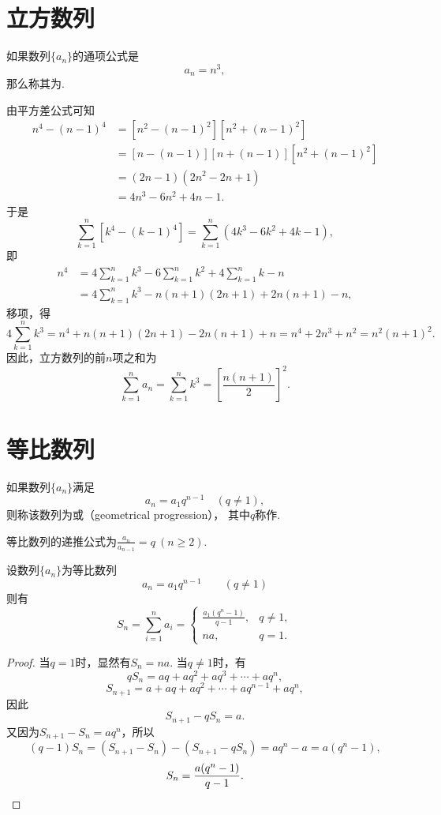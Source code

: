 \section{立方数列}
如果数列\(\{a_n\}\)的通项公式是\[
a_n = n^3,
\]那么称其为.

由平方差公式可知
\[\begin{aligned}
n^4 - (n-1)^4
&= [n^2 - (n-1)^2] [n^2 + (n-1)^2] \\
&= [n - (n-1)] [n + (n-1)] [n^2 + (n-1)^2] \\
&= (2n-1) (2n^2 - 2n + 1) \\
&= 4n^3 - 6n^2 + 4n - 1.
\end{aligned}\]
于是\[
\sum\limits_{k=1}^n [k^4 - (k-1)^4]
= \sum\limits_{k=1}^n (4k^3 - 6k^2 + 4k - 1),
\]即\[\begin{aligned}
n^4
&= 4 \sum\limits_{k=1}^n k^3 - 6 \sum\limits_{k=1}^n k^2 + 4 \sum\limits_{k=1}^n k - n \\
&= 4 \sum\limits_{k=1}^n k^3 - n(n+1)(2n+1) + 2n(n+1) - n,
\end{aligned}\]
移项，得\[
4 \sum\limits_{k=1}^n k^3
= n^4 + n(n+1)(2n+1) - 2n(n+1) + n
= n^4 + 2n^3 + n^2
= n^2(n+1)^2.
\]
因此，立方数列的前\(n\)项之和为
\begin{equation}
\sum\limits_{k=1}^n a_n
= \sum\limits_{k=1}^n k^3
= \left[\frac{n(n+1)}{2}\right]^2.
\end{equation}

\section{等比数列}
\begin{definition}
如果数列\(\{a_n\}\)满足\[
a_n = a_1 q^{n-1} \quad(q\neq1),
\]则称该数列为或（geometrical progression），
其中\(q\)称作.

等比数列的递推公式为\(\frac{a_n}{a_{n-1}} = q\ (n \geq 2)\).
\end{definition}

\begin{property}[等比数列求和]
设数列\(\{a_n\}\)为等比数列\[
a_n = a_1 q^{n-1} \qquad (q \neq 1)
\]则有\[
S_n = \sum\limits_{i=1}^n a_i
= \left\{ \begin{array}{cl}
\frac{a_1 (q^n-1)}{q-1}, & q \neq 1, \\
na, & q = 1.
\end{array} \right.
\]
\begin{proof}
当\(q = 1\)时，显然有\(S_n = na\).
当\(q \neq 1\)时，有\[
q S_n = aq+aq^2+aq^3+\dotsb+aq^n,
\]\[
S_{n+1} = a+aq+aq^2+\dotsb+aq^{n-1}+aq^n,
\]因此\[
S_{n+1} - q S_n = a.
\]又因为\(S_{n+1} - S_n = aq^n\)，所以\[
(q-1) S_n = (S_{n+1} - S_n) - (S_{n+1} - q S_n) = aq^n - a = a(q^n - 1),
\]\[
S_n = \frac{a(q^n - 1)}{q-1}.
\qedhere
\]
\end{proof}
\end{property}

